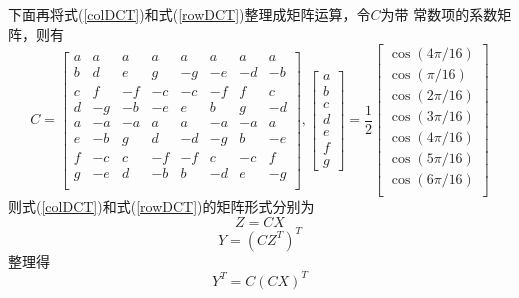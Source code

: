 \documentclass{article}
\numberwithin {equation}{section}
\begin{document}
\begin{spacing}{1.25}
      下面再将式(\ref{colDCT})和式(\ref{rowDCT})整理成矩阵运算，令$C$为带
      常数项的系数矩阵，则有
      \begin{equation}
        C=\begin{bmatrix}
          a & a   & a   & a   & a   & a   & a   & a\\
          b & d   & e   & g   & -g  & -e  & -d  & -b\\
          c & f   & -f  & -c  & -c  & -f  & f   & c\\
          d & -g  & -b  & -e  & e   & b   & g   & -d\\
          a & -a  & -a  & a   & a   & -a  & -a  & a\\
          e & -b  & g   & d   & -d  & -g  & b   & -e\\
          f & -c  & c   & -f  & -f  & c   & -c  & f\\
          g & -e  & d   & -b  & b   & -d  & e   & -g\\
        \end{bmatrix},
        \begin{bmatrix}
          a \\ b \\ c \\ d \\ e \\ f \\ g
        \end{bmatrix}=
        \frac{1}{2}\begin{bmatrix}
          \cos(4\pi/16)\\
          \cos(\pi/16)\\
          \cos(2\pi/16)\\
          \cos(3\pi/16)\\
          \cos(4\pi/16)\\
          \cos(5\pi/16)\\
          \cos(6\pi/16)\\
        \end{bmatrix}
        \label{C}
      \end{equation}
      则式(\ref{colDCT})和式(\ref{rowDCT})的矩阵形式分别为
      \begin{equation}
        Z=CX 
        \label{col}
      \end{equation}
      \begin{equation}
        Y=(CZ^{T})^{T}
      \end{equation}
      整理得
      \begin{equation}
        Y^{T}=C(CX)^{T} 

\end{equation}
\end{spacing}
\end{document}
